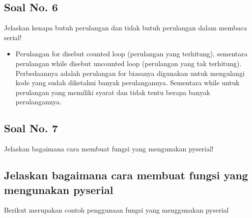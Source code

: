 \subsection{Soal No. 6}
Jelaskan kenapa butuh perulangan dan tidak butuh perulangan dalam membaca serial!
\begin{itemize}
\item Perulangan for disebut counted loop (perulangan yang terhitung), sementara perulangan while disebut uncounted loop (perulangan yang tak terhitung). Perbedaannya adalah perulangan for biasanya digunakan untuk mengulangi kode yang sudah diketahui banyak perulangannya. Sementara while untuk perulangan yang memiliki syarat dan tidak tentu berapa banyak perulangannya.
\end{itemize}
\subsection{Soal No. 7}
Jelaskan bagaimana cara membuat fungsi yang mengunakan pyserial!

\subsection{Jelaskan bagaimana cara membuat fungsi yang mengunakan pyserial}
Berikut merupakan contoh penggunaan fungsi yang menggunakan pyserial


